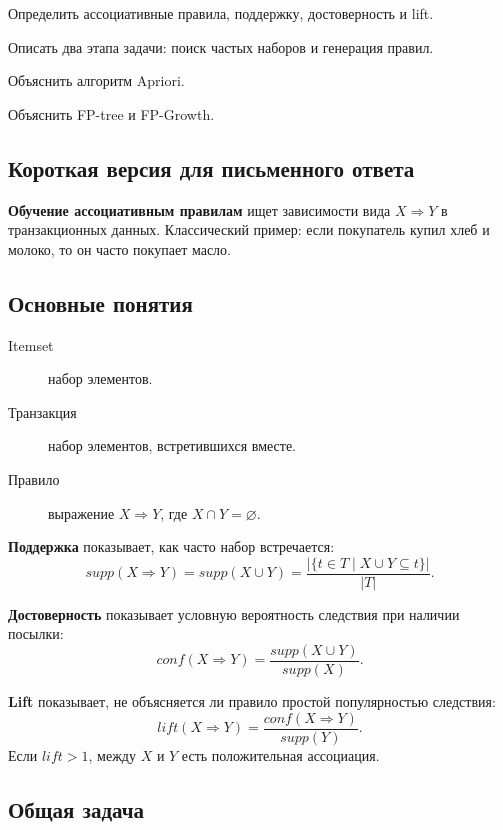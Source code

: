 
\begin{examplan}
    \item Определить ассоциативные правила, поддержку, достоверность и lift.
    \item Описать два этапа задачи: поиск частых наборов и генерация правил.
    \item Объяснить алгоритм Apriori.
    \item Объяснить FP-tree и FP-Growth.
\end{examplan}

\subsection*{Короткая версия для письменного ответа}

\textbf{Обучение ассоциативным правилам} ищет зависимости вида $X\Rightarrow Y$ в транзакционных данных. Классический пример: если покупатель купил хлеб и молоко, то он часто покупает масло.

\subsection*{Основные понятия}

\begin{description}
    \item[Itemset] набор элементов.
    \item[Транзакция] набор элементов, встретившихся вместе.
    \item[Правило] выражение $X\Rightarrow Y$, где $X\cap Y=\varnothing$.
\end{description}

\textbf{Поддержка} показывает, как часто набор встречается:
\[
supp(X\Rightarrow Y)=supp(X\cup Y)=\frac{|\{t\in T\mid X\cup Y\subseteq t\}|}{|T|}.
\]

\textbf{Достоверность} показывает условную вероятность следствия при наличии посылки:
\[
conf(X\Rightarrow Y)=\frac{supp(X\cup Y)}{supp(X)}.
\]

\textbf{Lift} показывает, не объясняется ли правило простой популярностью следствия:
\[
lift(X\Rightarrow Y)=\frac{conf(X\Rightarrow Y)}{supp(Y)}.
\]
Если $lift>1$, между $X$ и $Y$ есть положительная ассоциация.

\subsection*{Общая задача}

